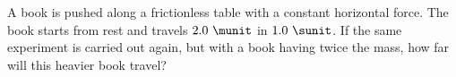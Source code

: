 A book is pushed along a frictionless table with a constant
horizontal force. The book starts from rest and travels $2.0\ \munit$
in $1.0\ \sunit$. If the same experiment is carried out again, but with
a book having twice the mass, how far will this heavier book
travel?
